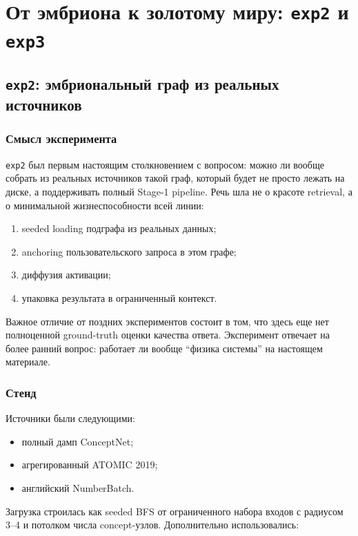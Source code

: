 \chapter{От эмбриона к золотому миру: \texttt{exp2} и \texttt{exp3}}

\section{\texttt{exp2}: эмбриональный граф из реальных источников}

\subsection{Смысл эксперимента}

\texttt{exp2} был первым настоящим столкновением с вопросом: можно ли вообще
собрать из реальных источников такой граф, который будет не просто лежать на
диске, а поддерживать полный Stage-1 pipeline. Речь шла не о красоте retrieval,
а о минимальной жизнеспособности всей линии:

\begin{enumerate}[leftmargin=2em]
\item seeded loading подграфа из реальных данных;
\item anchoring пользовательского запроса в этом графе;
\item диффузия активации;
\item упаковка результата в ограниченный контекст.
\end{enumerate}

Важное отличие от поздних экспериментов состоит в том, что здесь еще нет
полноценной ground-truth оценки качества ответа. Эксперимент отвечает на более
ранний вопрос: работает ли вообще ``физика системы'' на настоящем материале.

\subsection{Стенд}

Источники были следующими:

\begin{itemize}[leftmargin=2em]
\item полный дамп ConceptNet;
\item агрегированный ATOMIC 2019;
\item английский NumberBatch.
\end{itemize}

Загрузка строилась как seeded BFS от ограниченного набора входов с радиусом 3--4
и потолком числа concept-узлов. Дополнительно использовались:

